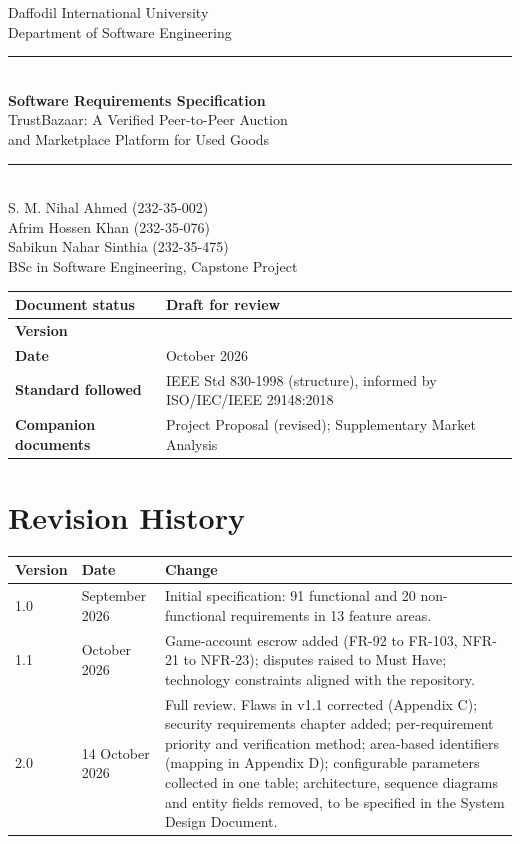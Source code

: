 \documentclass[11pt,a4paper]{report}
\begin{document}
\begin{titlepage}
\centering
\vspace*{0.5cm}
{\Large Daffodil International University}\\[0.3cm]
{\large Department of Software Engineering}\\[1.8cm]
\rule{\linewidth}{0.5pt}\\[0.4cm]
{\huge \textbf{Software Requirements Specification}}\\[0.4cm]
{\Large TrustBazaar: A Verified Peer-to-Peer Auction\\[0.1cm] and Marketplace Platform for Used Goods}\\[0.4cm]
\rule{\linewidth}{0.5pt}\\[1.5cm]
{\large
S. M. Nihal Ahmed (232-35-002)\\[0.15cm]
Afrim Hossen Khan (232-35-076)\\[0.15cm]
Sabikun Nahar Sinthia (232-35-475)\\[0.8cm]
BSc in Software Engineering, Capstone Project\\[1.5cm]
}
\begin{tabular}{|l|>{\raggedright\arraybackslash}p{8.2cm}|}
\hline
\textbf{Document status} & Draft for review \\ \hline
\textbf{Version} & 2.0 \\ \hline
\textbf{Date} & 14 October 2026 \\ \hline
\textbf{Standard followed} & IEEE Std 830-1998 (structure), informed by ISO/IEC/IEEE 29148:2018 \\ \hline
\textbf{Companion documents} & Project Proposal (revised); Supplementary Market Analysis \\ \hline
\end{tabular}
\vfill
\end{titlepage}

\section*{Revision History}
\begin{center}
\small
\begin{tabularx}{\textwidth}{@{}l l X@{}}
\toprule
\textbf{Version} & \textbf{Date} & \textbf{Change} \\
\midrule
1.0 & September 2026 & Initial specification: 91 functional and 20 non-functional requirements in 13 feature areas. \\
1.1 & October 2026 & Game-account escrow added (FR-92 to FR-103, NFR-21 to NFR-23); disputes raised to Must Have; technology constraints aligned with the repository. \\
2.0 & 14 October 2026 & Full review. Flaws in v1.1 corrected (Appendix C); security requirements chapter added; per-requirement priority and verification method; area-based identifiers (mapping in Appendix D); configurable parameters collected in one table; architecture, sequence diagrams and entity fields removed, to be specified in the System Design Document. \\
\bottomrule
\end{tabularx}
\end{center}
\end{document}
